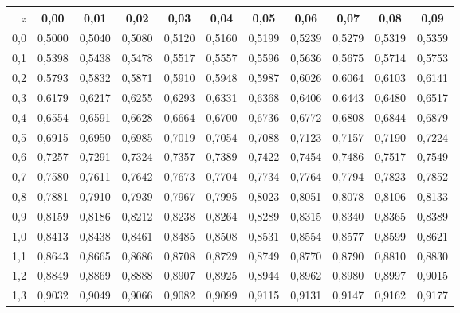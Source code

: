 \footnotesize\setlength{\tabcolsep}{2.6pt}\renewcommand{\arraystretch}{1.12}
\begin{center}
\begin{tabular}{@{}r|cccccccccc@{}}
\toprule
$z$ & 0{,}00 & 0{,}01 & 0{,}02 & 0{,}03 & 0{,}04 & 0{,}05 & 0{,}06 & 0{,}07 & 0{,}08 & 0{,}09 \\
\midrule
0{,}0 & 0{,}5000 & 0{,}5040 & 0{,}5080 & 0{,}5120 & 0{,}5160 & 0{,}5199 & 0{,}5239 & 0{,}5279 & 0{,}5319 & 0{,}5359 \\
0{,}1 & 0{,}5398 & 0{,}5438 & 0{,}5478 & 0{,}5517 & 0{,}5557 & 0{,}5596 & 0{,}5636 & 0{,}5675 & 0{,}5714 & 0{,}5753 \\
0{,}2 & 0{,}5793 & 0{,}5832 & 0{,}5871 & 0{,}5910 & 0{,}5948 & 0{,}5987 & 0{,}6026 & 0{,}6064 & 0{,}6103 & 0{,}6141 \\
0{,}3 & 0{,}6179 & 0{,}6217 & 0{,}6255 & 0{,}6293 & 0{,}6331 & 0{,}6368 & 0{,}6406 & 0{,}6443 & 0{,}6480 & 0{,}6517 \\
0{,}4 & 0{,}6554 & 0{,}6591 & 0{,}6628 & 0{,}6664 & 0{,}6700 & 0{,}6736 & 0{,}6772 & 0{,}6808 & 0{,}6844 & 0{,}6879 \\
0{,}5 & 0{,}6915 & 0{,}6950 & 0{,}6985 & 0{,}7019 & 0{,}7054 & 0{,}7088 & 0{,}7123 & 0{,}7157 & 0{,}7190 & 0{,}7224 \\
0{,}6 & 0{,}7257 & 0{,}7291 & 0{,}7324 & 0{,}7357 & 0{,}7389 & 0{,}7422 & 0{,}7454 & 0{,}7486 & 0{,}7517 & 0{,}7549 \\
0{,}7 & 0{,}7580 & 0{,}7611 & 0{,}7642 & 0{,}7673 & 0{,}7704 & 0{,}7734 & 0{,}7764 & 0{,}7794 & 0{,}7823 & 0{,}7852 \\
0{,}8 & 0{,}7881 & 0{,}7910 & 0{,}7939 & 0{,}7967 & 0{,}7995 & 0{,}8023 & 0{,}8051 & 0{,}8078 & 0{,}8106 & 0{,}8133 \\
0{,}9 & 0{,}8159 & 0{,}8186 & 0{,}8212 & 0{,}8238 & 0{,}8264 & 0{,}8289 & 0{,}8315 & 0{,}8340 & 0{,}8365 & 0{,}8389 \\
1{,}0 & 0{,}8413 & 0{,}8438 & 0{,}8461 & 0{,}8485 & 0{,}8508 & 0{,}8531 & 0{,}8554 & 0{,}8577 & 0{,}8599 & 0{,}8621 \\
1{,}1 & 0{,}8643 & 0{,}8665 & 0{,}8686 & 0{,}8708 & 0{,}8729 & 0{,}8749 & 0{,}8770 & 0{,}8790 & 0{,}8810 & 0{,}8830 \\
1{,}2 & 0{,}8849 & 0{,}8869 & 0{,}8888 & 0{,}8907 & 0{,}8925 & 0{,}8944 & 0{,}8962 & 0{,}8980 & 0{,}8997 & 0{,}9015 \\
1{,}3 & 0{,}9032 & 0{,}9049 & 0{,}9066 & 0{,}9082 & 0{,}9099 & 0{,}9115 & 0{,}9131 & 0{,}9147 & 0{,}9162 & 0{,}9177 \\

\end{tabular}
\end{center}

